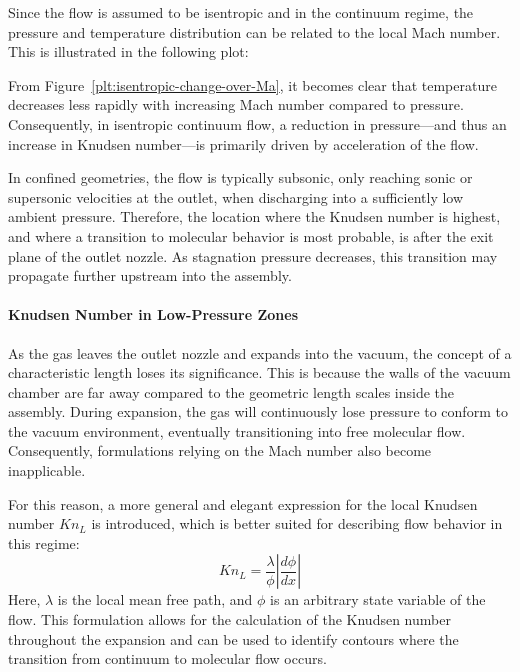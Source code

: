 	Since the flow is assumed to be isentropic and in the continuum regime, the pressure and temperature distribution can be related to the local Mach number.
	This is illustrated in the following plot:

	

	From Figure~\ref{plt:isentropic-change-over-Ma}, it becomes clear that temperature decreases less rapidly with increasing Mach number compared to pressure.
	Consequently, in isentropic continuum flow, a reduction in pressure—and thus an increase in Knudsen number—is primarily driven by acceleration of the flow.

	In confined geometries, the flow is typically subsonic, only reaching sonic or supersonic velocities at the outlet, when discharging into a sufficiently low ambient pressure.
	Therefore, the location where the Knudsen number is highest, and where a transition to molecular behavior is most probable, is after the exit plane of the outlet nozzle.
	As stagnation pressure decreases, this transition may propagate further upstream into the assembly.

	\paragraph{Knudsen Number in Low-Pressure Zones}
		As the gas leaves the outlet nozzle and expands into the vacuum, the concept of a characteristic length loses its significance.
		This is because the walls of the vacuum chamber are far away compared to the geometric length scales inside the assembly.
		During expansion, the gas will continuously lose pressure to conform to the vacuum environment, eventually transitioning into free molecular flow.
		Consequently, formulations relying on the Mach number also become inapplicable.

		For this reason, a more general and elegant expression for the local Knudsen number $Kn_L$ is introduced, which is better suited for describing flow behavior in this regime:
		\begin{equation}
			Kn_L = \frac{\lambda}{\phi} \left| \frac{d\phi}{dx} \right|
		\end{equation}
		Here, $\lambda$ is the local mean free path, and $\phi$ is an arbitrary state variable of the flow.
		This formulation allows for the calculation of the Knudsen number throughout the expansion and can be used to identify contours where the transition from continuum to molecular flow occurs.
		\cite{bird_dsmc_2013, Grabe2008, LiLam1964}

